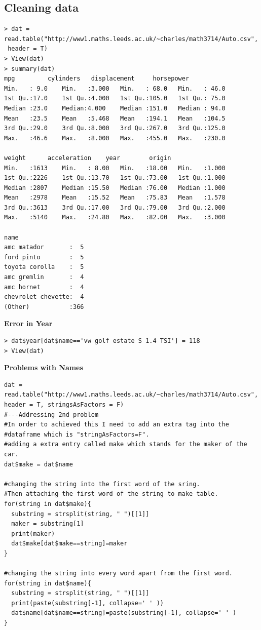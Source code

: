 \documentclass[11pt]{article} %
\begin{document}
\subsection{Cleaning data}
\begin{lstlisting}
> dat = read.table("http://www1.maths.leeds.ac.uk/~charles/math3714/Auto.csv",
 header = T)
> View(dat)
> summary(dat)
mpg 		cylinders	displacement	 horsepower
Min.   : 9.0	Min.   :3.000	Min.   : 68.0 	Min.   : 46.0
1st Qu.:17.0	1st Qu.:4.000	1st Qu.:105.0	1st Qu.: 75.0
Median :23.0	Median:4.000	Median :151.0	Median : 94.0
Mean   :23.5	Mean   :5.468	Mean   :194.1	Mean   :104.5
3rd Qu.:29.0	3rd Qu.:8.000	3rd Qu.:267.0	3rd Qu.:125.0
Max.   :46.6	Max.   :8.000	Max.   :455.0	Max.   :230.0

weight		acceleration	year		origin
Min.   :1613	Min.   : 8.00	Min.   :18.00	Min.   :1.000
1st Qu.:2226	1st Qu.:13.70	1st Qu.:73.00	1st Qu.:1.000
Median :2807	Median :15.50	Median :76.00	Median :1.000
Mean   :2978	Mean   :15.52	Mean   :75.83	Mean   :1.578
3rd Qu.:3613	3rd Qu.:17.00	3rd Qu.:79.00	3rd Qu.:2.000
Max.   :5140	Max.   :24.80	Max.   :82.00	Max.   :3.000

name
amc matador       :  5
ford pinto        :  5
toyota corolla    :  5
amc gremlin       :  4
amc hornet        :  4
chevrolet chevette:  4
(Other)           :366
\end{lstlisting}
\textbf{Error in Year}
\begin{lstlisting}
> dat$year[dat$name=='vw golf estate S 1.4 TSI'] = 118
> View(dat)
\end{lstlisting}
\textbf{Problems with Names}
\begin{lstlisting}
dat = read.table("http://www1.maths.leeds.ac.uk/~charles/math3714/Auto.csv", header = T, stringsAsFactors = F)
#---Addressing 2nd problem
#In order to achieved this I need to add an extra tag into the 
#dataframe which is "stringAsFactors=F".
#adding a extra entry called make which stands for the maker of the car.
dat$make = dat$name

#changing the string into the first word of the sring.
#Then attaching the first word of the string to make table.
for(string in dat$make){
  substring = strsplit(string, " ")[[1]]
  maker = substring[1]
  print(maker)
  dat$make[dat$make==string]=maker
}

#changing the string into every word apart from the first word.
for(string in dat$name){
  substring = strsplit(string, " ")[[1]]
  print(paste(substring[-1], collapse=' ' ))
  dat$name[dat$name==string]=paste(substring[-1], collapse=' ' )
}
\end{lstlisting}
\end{document}
